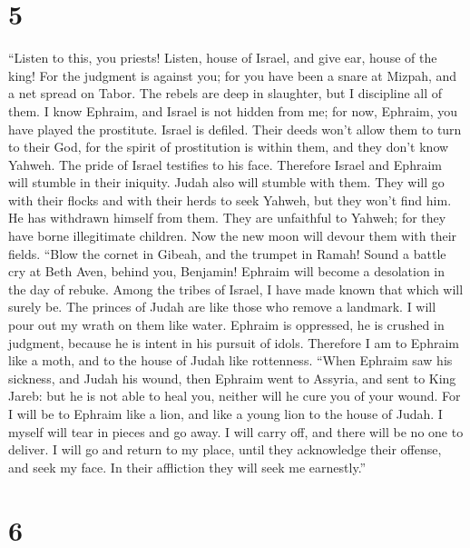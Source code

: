 \hypertarget{section-4}{%
\section{5}\label{section-4}}

 ``Listen to this, you priests! Listen, house of Israel,
and give ear, house of the king! For the judgment is against you; for
you have been a snare at Mizpah, and a net spread on Tabor.
 The rebels are deep in slaughter, but I discipline all of
them.  I know Ephraim, and Israel is not hidden from me;
for now, Ephraim, you have played the prostitute. Israel is defiled.
 Their deeds won't allow them to turn to their God, for
the spirit of prostitution is within them, and they don't know Yahweh.
 The pride of Israel testifies to his face. Therefore
Israel and Ephraim will stumble in their iniquity. Judah also will
stumble with them.  They will go with their flocks and
with their herds to seek Yahweh, but they won't find him. He has
withdrawn himself from them.  They are unfaithful to
Yahweh; for they have borne illegitimate children. Now the new moon will
devour them with their fields.  ``Blow the cornet in
Gibeah, and the trumpet in Ramah! Sound a battle cry at Beth Aven,
behind you, Benjamin!  Ephraim will become a desolation in
the day of rebuke. Among the tribes of Israel, I have made known that
which will surely be.  The princes of Judah are like
those who remove a landmark. I will pour out my wrath on them like
water.  Ephraim is oppressed, he is crushed in judgment,
because he is intent in his pursuit of idols.  Therefore
I am to Ephraim like a moth, and to the house of Judah like rottenness.
 ``When Ephraim saw his sickness, and Judah his wound,
then Ephraim went to Assyria, and sent to King Jareb: but he is not able
to heal you, neither will he cure you of your wound.  For
I will be to Ephraim like a lion, and like a young lion to the house of
Judah. I myself will tear in pieces and go away. I will carry off, and
there will be no one to deliver.  I will go and return to
my place, until they acknowledge their offense, and seek my face. In
their affliction they will seek me earnestly.''

\hypertarget{section-5}{%
\section{6}\label{section-5}}

